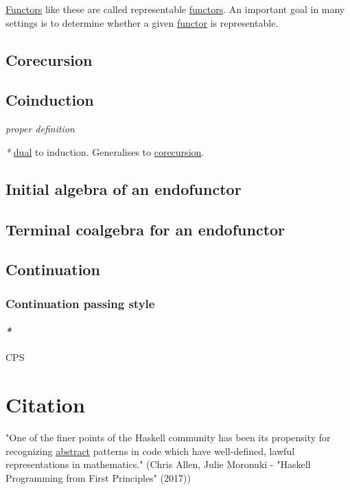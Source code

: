 \documentclass[a4paper,14pt,oneside]{book}
\begin{document}
\hyperref[org8d9a7eb]{Functors} like these are called representable \hyperref[org8d9a7eb]{functors}. An important goal in many settings is to determine whether a given \hyperref[org1a63dc6]{functor} is representable.

\chapter{\label{orgbdfec6d}Corecursion}
\label{sec:org6217074}
\chapter{\label{orge3dcc9e}Coinduction}
\label{sec:org7e5170f}

\emph{proper definition}

\emph{*} \hyperref[org61b5feb]{dual} to induction.
Generalises to \hyperref[orgbdfec6d]{corecursion}.

\chapter{\label{org6e9c2c5}Initial algebra of an endofunctor}
\label{sec:orgec14027}
\chapter{\label{orge02116e}Terminal coalgebra for an endofunctor}
\label{sec:org9b8d9a4}
\chapter{Continuation}
\label{sec:orgd26c7e0}
\section{Continuation passing style}
\label{sec:orgfdd7e3b}

\subsection{\emph{*}}
\label{sec:orgf39cd8e}

CPS

\part{Citation}
\label{sec:org682a227}

"One of the finer points of the Haskell community has been its propensity for recognizing \hyperref[orgbd14c46]{abstract} patterns in code which have well-defined, lawful representations in mathematics." (Chris Allen, Julie Moronuki - "Haskell Programming from First Principles" (2017))
\end{document}
